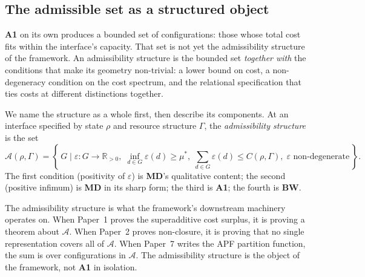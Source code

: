 \documentclass[11pt]{article}
\newcommand{\Aone}{\textbf{A1}}
\begin{document}
\subsection{The admissible set as a structured object}\label{sec:admissible_set}

\Aone{} on its own produces a bounded set of configurations: those whose total cost fits within the interface's capacity. That set is not yet the admissibility structure of the framework. An admissibility structure is the bounded set \emph{together with} the conditions that make its geometry non-trivial: a lower bound on cost, a non-degeneracy condition on the cost spectrum, and the relational specification that ties costs at different distinctions together.

We name the structure as a whole first, then describe its components. At an interface specified by state $\rho$ and resource structure $\Gamma$, the \emph{admissibility structure} is the set
\[
\mathcal{A}(\rho, \Gamma) = \left\{\, G \;\Big|\; \varepsilon : G \to \mathbb{R}_{>0},\; \inf_{d \in G}\varepsilon(d) \geq \mu^*,\; \sum_{d \in G} \varepsilon(d) \leq C(\rho, \Gamma),\; \varepsilon \text{ non-degenerate} \,\right\}.
\]
The first condition (positivity of $\varepsilon$) is \textbf{MD}'s qualitative content; the second (positive infimum) is \textbf{MD} in its sharp form; the third is \Aone{}; the fourth is \textbf{BW}.

The admissibility structure is what the framework's downstream machinery operates on. When Paper~1 proves the superadditive cost surplus, it is proving a theorem about $\mathcal{A}$. When Paper~2 proves non-closure, it is proving that no single representation covers all of $\mathcal{A}$. When Paper~7 writes the APF partition function, the sum is over configurations in $\mathcal{A}$. The admissibility structure is the object of the framework, not \Aone{} in isolation.
\end{document}
